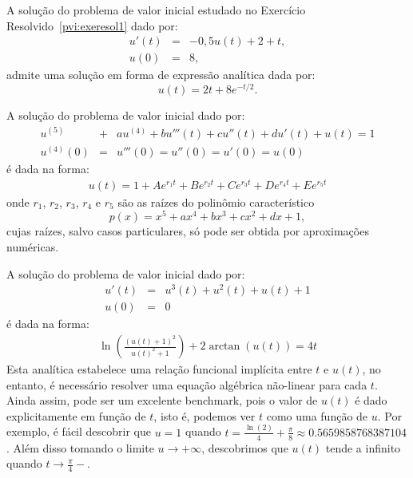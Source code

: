 \begin{ex} A solução do problema de valor inicial estudado no Exercício Resolvido~\ref{pvi:exeresol1} dado por:
\begin{eqnarray*}
     u'(t)&=& -0,5u(t)+2+t,\\
            u(0) &=&  8,
\end{eqnarray*}
admite uma solução em forma de expressão analítica dada por:
\begin{equation*}
     u(t) = 2t+8e^{-t/2}. 
\end{equation*} 
\end{ex}

\begin{ex} A solução do problema de valor inicial dado por:
\begin{eqnarray*}
u^{(5)}&+&au^{(4)}+bu'''(t)+cu''(t)+du'(t)+u(t)=1\\
u^{(4)}(0)&=&u'''(0)=u''(0)=u'(0)=u(0)
\end{eqnarray*}
é dada na forma:
\begin{eqnarray*}
u(t)=1+Ae^{r_1 t} + Be^{r_2 t} + Ce^{r_3 t} + De^{r_4 t} + Ee^{r_5 t} 
\end{eqnarray*}
onde $r_1$, $r_2$, $r_3$, $r_4$ e $r_5$ são as raízes do polinômio característico $$p(x)=x^5+ax^4+bx^3+cx^2+dx+1,$$
cujas raízes, salvo casos particulares, só pode ser obtida por aproximações numéricas.
 \end{ex}


 \begin{ex} A solução do problema de valor inicial dado por:
\begin{eqnarray*}
u'(t)&=&u^3(t)+u^2(t)+u(t)+1\\
u(0)&=&0
\end{eqnarray*}
é dada na forma:
\begin{eqnarray*}
\ln  \left(\frac{\left(u(t) +1\right)^2}{u(t)^2+1}\right) +2\arctan \left( u \left( t \right)  \right) =4t
\end{eqnarray*}
Esta analítica estabelece uma relação funcional implícita entre $t$ e $u(t)$, no entanto, é necessário resolver uma equação algébrica não-linear para cada $t$. Ainda assim, pode ser um excelente benchmark, pois o valor de $u(t)$ é dado explicitamente em função de $t$, isto é, podemos ver $t$ como uma função de $u$. Por exemplo, é fácil descobrir que $u=1$ quando $t=\frac{\ln(2)}{4}+\frac{\pi}{8}\approx 0.5659858768387104$. Além disso tomando o limite $u\to +\infty$, descobrimos que $u(t)$ tende a infinito quando $t\to \frac{\pi}{4}-$.
\end{ex}

